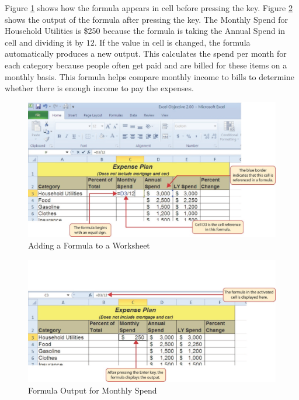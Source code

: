 Figure \ref{02:fig03} shows how the formula appears in cell  before pressing the  key. Figure \ref{02:fig04} shows the output of the formula after pressing the  key. The Monthly Spend for Household Utilities is \$250 because the formula is taking the Annual Spend in cell  and dividing it by $ 12 $. If the value in cell  is changed, the formula automatically produces a new output. This calculates the spend per month for each category because people often get paid and are billed for these items on a monthly basis. This formula helps compare monthly income to bills to determine whether there is enough income to pay the expenses.

\begin{figure}[H]
	\centering
	\includegraphics[width=\maxwidth{.95\linewidth}]{gfx/ch02_fig03}
	\caption{Adding a Formula to a Worksheet}
	\label{02:fig03}
\end{figure}

\begin{figure}[H]
	\centering
	\includegraphics[width=\maxwidth{.95\linewidth}]{gfx/ch02_fig04}
	\caption{Formula Output for Monthly Spend}
	\label{02:fig04}
\end{figure}


